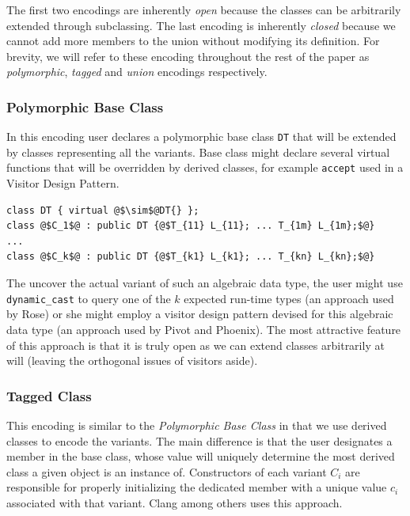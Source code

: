 \documentclass[preprint]{sigplanconf}
\makeatletter
\DeclareRobustCommand{\code}[1]{{\lstinline[breaklines=false,escapechar=@]{#1}}}
\makeatother
\begin{document}
The first two encodings are inherently \emph{open} because the classes can be 
arbitrarily extended through subclassing. The last encoding is inherently 
\emph{closed} because we cannot add more members to the union without modifying 
its definition. For brevity, we will refer to these encoding throughout the rest 
of the paper as \emph{polymorphic}, \emph{tagged} and \emph{union} encodings 
respectively.

\subsubsection{Polymorphic Base Class}
\label{sec:pbc}

In this encoding user declares a polymorphic base class \code{DT} that will 
be extended by classes representing all the variants. Base class might declare 
several virtual functions that will be overridden by derived classes, for example 
\code{accept} used in a Visitor Design Pattern.

\begin{lstlisting}[keepspaces,columns=flexible]
class DT { virtual @$\sim$@DT{} };
class @$C_1$@ : public DT {@$T_{11} L_{11}; ... T_{1m} L_{1m};$@} 
...
class @$C_k$@ : public DT {@$T_{k1} L_{k1}; ... T_{kn} L_{kn};$@} 
\end{lstlisting}

The uncover the actual variant of such an algebraic data type, the user might 
use \code{dynamic_cast} to query one of the $k$ expected run-time types (an 
approach used by Rose\cite{SQ03}) or she might employ a visitor design pattern 
devised for this algebraic data type (an approach used by Pivot\cite{Pivot09} 
and Phoenix\cite{Phoenix}). The most attractive feature of this approach is that 
it is truly open as we can extend classes arbitrarily at will (leaving the 
orthogonal issues of visitors aside).

\subsubsection{Tagged Class}
\label{sec:tc}

This encoding is similar to the \emph{Polymorphic Base Class} in that we use 
derived classes to encode the variants. The main difference is that the user 
designates a member in the base class, whose value will uniquely 
determine the most derived class a given object is an instance of. Constructors 
of each variant $C_i$ are responsible for properly initializing the dedicated 
member with a unique value $c_i$ associated with that variant. Clang\cite{Clang} 
among others uses this approach.
\end{document}
